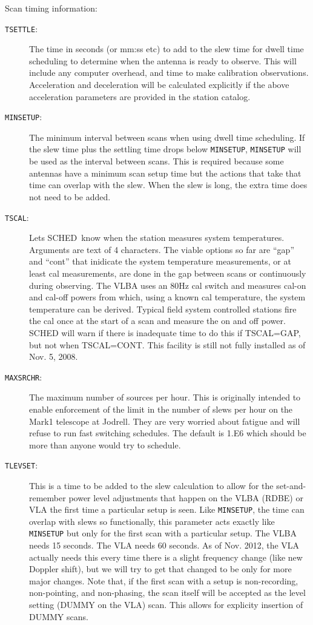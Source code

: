 \documentclass{report}
\newcommand{\schedb}{{\sc SCHED~}}
\begin{document}
Scan timing information:

\begin{description}

\item [{\tt TSETTLE}:] The time in seconds (or mm:ss etc) to add to
the slew time for dwell time scheduling to determine when the antenna
is ready to observe.  This will include any computer overhead,
and time to make calibration observations.  Acceleration and
deceleration will be calculated explicitly if the above acceleration
parameters are provided in the station catalog.

\item [{\tt MINSETUP}:] The minimum interval between scans when using
dwell time scheduling.  If the slew time plus the settling time
drops below {\tt MINSETUP}, {\tt MINSETUP} will be used as the
interval between scans.  This is required because some antennas have
a minimum scan setup time but the actions that take that time can
overlap with the slew.  When the slew is long, the extra time does
not need to be added.

\item [{\tt TSCAL}:] Lets \schedb know when the station measures
system temperatures.  Arguments are text of 4 characters.  The viable
options so far are ``gap'' and ``cont'' that inidicate the system temperature
measurements, or at least cal measurements, are done in the gap between
scans or continuously during observing.  The VLBA uses an 80Hz cal switch
and measures cal-on and cal-off powers from which, using a known cal
temperature, the system temperature can be derived.  Typical field system
controlled stations fire the cal once at the start of a scan and measure
the on and off power.  {\sc SCHED} will warn if there is inadequate time to
do this if TSCAL=GAP, but not when TSCAL=CONT.  This facility is still
not fully installed as of Nov. 5, 2008.

\item [{\tt MAXSRCHR}:] The maximum number of sources per hour.
This is originally intended to enable enforcement of the limit in
the number of slews per hour on the Mark1 telescope at Jodrell.  They
are very worried about fatigue and will refuse to run fast switching
schedules.  The default is 1.E6 which should be more than anyone
would try to schedule.

\item [{\tt TLEVSET}:] This is a time to be added to the slew
calculation to allow for the set-and-remember power level adjustments
that happen on the VLBA (RDBE) or VLA the first time a particular
setup is seen.  Like {\tt MINSETUP}, the time can overlap with slews
so functionally, this parameter acts exactly like {\tt MINSETUP} but
only for the first scan with a particular setup.  The VLBA needs 15
seconds.  The VLA needs 60 seconds.  As of Nov. 2012, the VLA actually
needs this every time there is a slight frequency change (like new
Doppler shift), but we will try to get that changed to be only for
more major changes.  Note that, if the first scan with a setup is
non-recording, non-pointing, and non-phasing, the scan itself will be
accepted as the level setting (DUMMY on the VLA) scan.  This allows
for explicity insertion of DUMMY scans.



\end{description}
\end{document}
